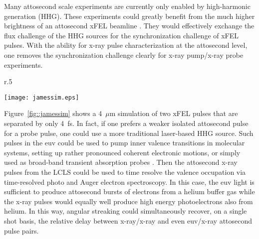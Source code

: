 Many attosecond scale experiments are currently only enabled by high-harmonic generation (HHG)\cite{Lewenstein1994,Hentschel2001,Chen2014,Biegert2014,Schmidt2016,Biegert2016,WornerSci2017,Zenghu2017}.
These experiments could greatly benefit from the much higher brightness of an attosecond xFEL beamline \cite{Ding2009,Xiang2009,xLEAP}.
They would effectively exchange the flux challenge of the HHG sources for the synchronization challenge of xFEL pulses.
With the ability for x-ray pulse characterization at the attosecond level, one removes the synchronization challenge clearly for x-ray pump/x-ray probe experiments.

\begin{wrapfigure}[18]{r}{.5\linewidth}
\vspace{-.5\baselineskip}
\centerline{\texttt{[image: jamessim.eps]}}
\vspace{-1.5\baselineskip}
\caption{\label{fig::jamessim} Simulated 4~$\mu$m angular streaking field for 4~fs separated pulses courtesy of James Cryan.}
\end{wrapfigure}
Figure~\ref{fig::jamessim} shows a 4~$\mu$m simulation of two xFEL pulses that are separated by only 4~fs.
In fact, if one prefers a weaker isolated attosecond pulse for a probe pulse, one could use a more traditional laser-based HHG source.
Such pulses in the euv could be used to pump inner valence transitions in molecular systems, setting up rather pronounced coherent electronic motions, or simply used as broad-band transient absorption probes \cite{Biegert2016}.
Then the attosecond x-ray pulses from the LCLS could be used to time resolve the valence occupation via time-resolved photo and Auger electron spectroscopy.
In this case, the euv light is sufficient to produce attosecond bursts of electrons from a helium buffer gas while the x-ray pulses would equally well produce high energy photoelectrons also from helium.
In this way, angular streaking could simultaneously recover, on a single shot basis, the relative delay between x-ray/x-ray and even euv/x-ray attosecond pulse pairs.

